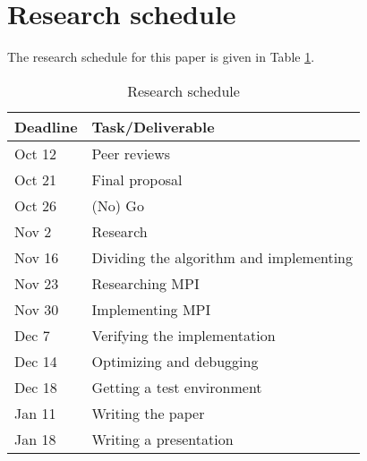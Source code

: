 \documentclass{sig-alternate-br}
\begin{document}
\section{Research schedule}
The research schedule for this paper is given in Table \ref{schedule}.

\begin{table}
\centering \caption{Research schedule} \label{schedule}
\begin{tabular}{|l|l|} \hline
\textbf{Deadline} & \textbf{Task/Deliverable}       \\ \hline
Oct 12 & Peer reviews                               \\ \hline
Oct 21 & Final proposal                             \\ \hline
Oct 26 & (No) Go                                    \\ \hline
Nov 2  & Research                                   \\ \hline
Nov 16 & Dividing the algorithm and implementing    \\ \hline
Nov 23 & Researching MPI                            \\ \hline
Nov 30 & Implementing MPI                           \\ \hline
Dec 7  & Verifying the implementation               \\ \hline
Dec 14 & Optimizing and debugging                   \\ \hline
Dec 18 & Getting a test environment                 \\ \hline
Jan 11 & Writing the paper                          \\ \hline
Jan 18 & Writing a presentation                     \\ \hline
\end{tabular}
\end{table}



\end{document}
